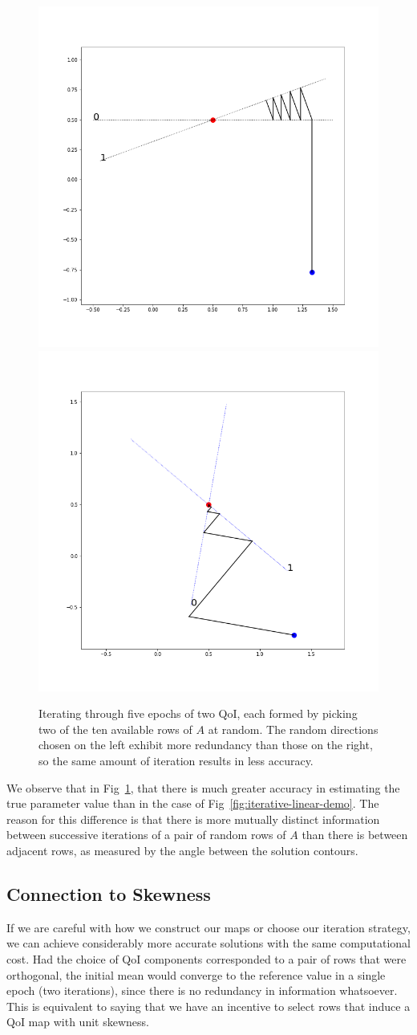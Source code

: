 \begin{figure}
  \centering
  \includegraphics[width=0.475\linewidth]{examples/iterative/10D-fewepochs-pair.png}
  \includegraphics[width=0.475\linewidth]{examples/iterative/10D-fewepochs-pair-alt.png}
  \caption{
  Iterating through five epochs of two QoI, each formed by picking two of the ten available rows of $A$ at random.
  The random directions chosen on the left exhibit more redundancy than those on the right, so the same amount of iteration results in less accuracy.
  }
  \label{fig:iterative-linear-demo-pair}
\end{figure}

We observe that in Fig~\ref{fig:iterative-linear-demo-pair}, that there is much greater accuracy in estimating the true parameter value than in the case of Fig~\ref{fig:iterative-linear-demo}.
The reason for this difference is that there is more mutually distinct information between successive iterations of a pair of random rows of $A$ than there is between adjacent rows, as measured by the angle between the solution contours.

\subsection{Connection to Skewness}
If we are careful with how we construct our maps or choose our iteration strategy, we can achieve considerably more accurate solutions with the same computational cost.
Had the choice of QoI components corresponded to a pair of rows that were orthogonal, the initial mean would converge to the reference value in a single epoch (two iterations), since there is no redundancy in information whatsoever.
This is equivalent to saying that we have an incentive to select rows that induce a QoI map with unit skewness.

